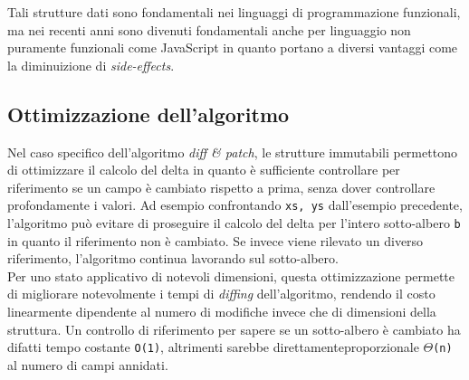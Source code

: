 Tali strutture dati sono fondamentali nei linguaggi di programmazione funzionali, ma nei recenti anni sono divenuti fondamentali anche per linguaggio non puramente funzionali come JavaScript in quanto portano a diversi vantaggi come la diminuizione di \textit{side-effects}.

\subsection{Ottimizzazione dell'algoritmo}

Nel caso specifico dell'algoritmo \textit{diff \& patch}, le strutture immutabili permettono di ottimizzare il calcolo del delta in quanto è sufficiente controllare per riferimento se un campo è cambiato rispetto a prima, senza dover controllare profondamente i valori. Ad esempio confrontando \texttt{xs, ys} dall'esempio precedente, l'algoritmo può evitare di proseguire il calcolo del delta per l'intero sotto-albero \texttt{b} in quanto il riferimento non è cambiato. Se invece viene rilevato un diverso riferimento, l'algoritmo continua lavorando sul sotto-albero. \\

Per uno stato applicativo di notevoli dimensioni, questa ottimizzazione permette di migliorare notevolmente i tempi di \textit{diffing} dell'algoritmo, rendendo il costo linearmente dipendente al numero di modifiche invece che di dimensioni della struttura. Un controllo di riferimento per sapere se un sotto-albero è cambiato ha difatti tempo costante \texttt{O(1)}, altrimenti sarebbe direttamenteproporzionale \texttt{$\Theta$(n)} al numero di campi annidati.
